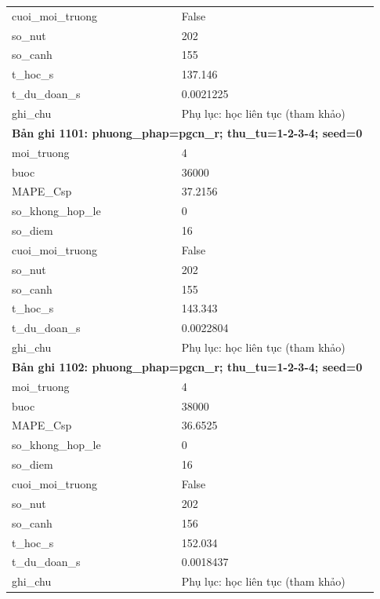 \begin{longtable}{p{0.43\linewidth}p{0.50\linewidth}}
cuoi\_\allowbreak moi\_\allowbreak truong & False \\
so\_\allowbreak nut & 202 \\
so\_\allowbreak canh & 155 \\
t\_\allowbreak hoc\_\allowbreak s & 137.146 \\
t\_\allowbreak du\_\allowbreak doan\_\allowbreak s & 0.0021225 \\
ghi\_\allowbreak chu & Phụ lục: học liên tục (tham khảo) \\
\midrule
\multicolumn{2}{p{0.95\linewidth}}{\textbf{Bản ghi 1101: phuong\_phap=pgcn\_r; thu\_tu=1-2-3-4; seed=0}} \\
moi\_\allowbreak truong & 4 \\
buoc & 36000 \\
MAPE\_\allowbreak Csp & 37.2156 \\
so\_\allowbreak khong\_\allowbreak hop\_\allowbreak le & 0 \\
so\_\allowbreak diem & 16 \\
cuoi\_\allowbreak moi\_\allowbreak truong & False \\
so\_\allowbreak nut & 202 \\
so\_\allowbreak canh & 155 \\
t\_\allowbreak hoc\_\allowbreak s & 143.343 \\
t\_\allowbreak du\_\allowbreak doan\_\allowbreak s & 0.0022804 \\
ghi\_\allowbreak chu & Phụ lục: học liên tục (tham khảo) \\
\midrule
\multicolumn{2}{p{0.95\linewidth}}{\textbf{Bản ghi 1102: phuong\_phap=pgcn\_r; thu\_tu=1-2-3-4; seed=0}} \\
moi\_\allowbreak truong & 4 \\
buoc & 38000 \\
MAPE\_\allowbreak Csp & 36.6525 \\
so\_\allowbreak khong\_\allowbreak hop\_\allowbreak le & 0 \\
so\_\allowbreak diem & 16 \\
cuoi\_\allowbreak moi\_\allowbreak truong & False \\
so\_\allowbreak nut & 202 \\
so\_\allowbreak canh & 156 \\
t\_\allowbreak hoc\_\allowbreak s & 152.034 \\
t\_\allowbreak du\_\allowbreak doan\_\allowbreak s & 0.0018437 \\
ghi\_\allowbreak chu & Phụ lục: học liên tục (tham khảo) \\

\end{longtable}
